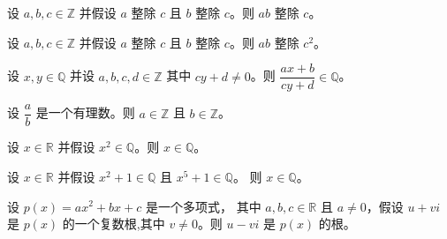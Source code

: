 \begin{chapex} %
设 $a,b,c \in \mathbb{Z}$ 并假设 $a$ 整除 $c$ 且 $b$ 整除 $c$。则 $ab$ 整除 $c$。
\end{chapex}

\begin{chapex} %
设 $a,b,c \in \mathbb{Z}$ 并假设 $a$ 整除 $c$ 且 $b$ 整除 $c$。则 $ab$ 整除 $c^2$。
\end{chapex}

\begin{chapex} %
设 $x,y \in \mathbb{Q}$ 并设 $a,b,c,d \in \mathbb{Z}$ 其中 $cy+d \ne 0$。则 $\dfrac{ax+b}{cy+d} \in \mathbb{Q}$。
\end{chapex}

\begin{chapex} %
设 $\dfrac{a}{b}$ 是一个有理数。则 $a \in \mathbb{Z}$ 且 $b \in \mathbb{Z}$。
\end{chapex}

\begin{chapex} %
设 $x \in \mathbb{R}$ 并假设 $x^2 \in \mathbb{Q}$。则 $x \in \mathbb{Q}$。
\end{chapex}

\begin{chapex} %
设 $x \in \mathbb{R}$ 并假设 $x^2+1 \in \mathbb{Q}$ 且 $x^5+1 \in \mathbb{Q}$。 则 $x \in \mathbb{Q}$。
\end{chapex}

\begin{chapex} %
\label{cqGettingStartedASNEnd}
设 $p(x) = ax^2+bx+c$ 是一个多项式， 其中 $a,b,c \in \mathbb{R}$ 且 $a \ne 0$，假设 $u+vi$ 是 $p(x)$ 的一个复数根,其中 $v \ne 0$。则 $u-vi$ 是 $p(x)$ 的根。
\end{chapex}